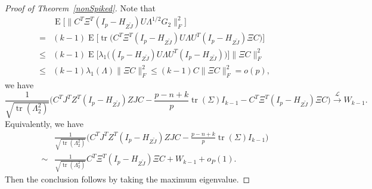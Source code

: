 \documentclass[review]{elsarticle}
\DeclareMathOperator{\mytr}{tr}
\DeclareMathOperator{\myE}{E}
\theoremstyle{plain}
\theoremstyle{definition}
\theoremstyle{remark}
\begin{document}
\begin{proof}[\textrm{Proof of Theorem~\ref{nonSpiked}}]
    Note that
    $$
    \begin{aligned}
        &\myE\big[\| C^T \Xi^T (I_p-H_{Z\tilde{J}})U\Lambda^{1/2}G_2\|_F^2\big]\\
        = &
        (k-1)\myE \big[\mytr\big(
        C^T \Xi^T (I_p-H_{Z\tilde{J}})U\Lambda U^T (I_p-H_{Z\tilde{J}})\Xi C
        \big)\big]\\
        \leq &
        (k-1)\myE \big[\lambda_1\big(
         (I_p-H_{Z\tilde{J}})U\Lambda U^T (I_p-H_{Z\tilde{J}})
        \big)\big]
        \|\Xi C\|_F^2\\
        \leq &
        (k-1)\lambda_1(\Lambda)\|\Xi C\|_F^2
        \leq 
        (k-1)C\|\Xi C\|_F^2=o(p),
    \end{aligned}
    $$
    we have
    $$
    \frac{1}{\sqrt{\mytr(\Lambda_2^2)}}
    {\Big(C^TJ^T Z^T(I_p-H_{Z\tilde J}) ZJC- \frac{p-n+k}{p}\mytr(\Sigma)I_{k-1}-C^T \Xi^T (I_p-H_{Z\tilde{J}})\Xi C}\Big)
    \xrightarrow{\mathcal{L}}W_{k-1}.
    $$
    Equivalently, we have
    $$
    \begin{aligned}
        &
    \frac{1}{\sqrt{\mytr(\Lambda_2^2)}}
        {\Big(C^TJ^T Z^T(I_p-H_{Z\tilde J}) ZJC- \frac{p-n+k}{p}\mytr(\Sigma)I_{k-1}}\Big)\\
        \sim&
    \frac{1}{\sqrt{\mytr(\Lambda_2^2)}}
         C^T \Xi^T (I_p-H_{Z\tilde{J}})\Xi C
        +W_{k-1}+o_P(1).
    \end{aligned}
    $$
    Then the conclusion follows by taking the maximum eigenvalue.
\end{proof}
\end{document}

